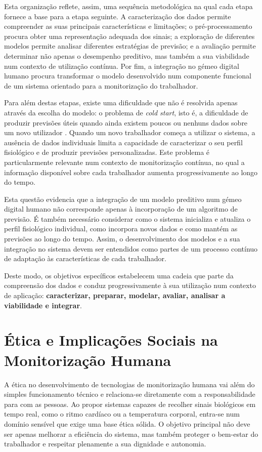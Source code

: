 Esta organização reflete, assim, uma sequência metodológica na qual cada etapa fornece a base para a etapa seguinte. A caracterização dos dados permite compreender as suas principais características e limitações; o pré-processamento procura obter uma representação adequada dos sinais; a exploração de diferentes modelos permite analisar diferentes estratégias de previsão; e a avaliação permite determinar não apenas o desempenho preditivo, mas também a sua viabilidade num contexto de utilização contínua. Por fim, a integração no gémeo digital humano procura transformar o modelo desenvolvido num componente funcional de um sistema orientado para a monitorização do trabalhador.

Para além destas etapas, existe uma dificuldade que não é resolvida apenas através da escolha do modelo: o problema de \textit{cold start}, isto é, a dificuldade de produzir previsões úteis quando ainda existem poucos ou nenhuns dados sobre um novo utilizador \cite{schein2002coldstart}. Quando um novo trabalhador começa a utilizar o sistema, a ausência de dados individuais limita a capacidade de caracterizar o seu perfil fisiológico e de produzir previsões personalizadas. Este problema é particularmente relevante num contexto de monitorização contínua, no qual a informação disponível sobre cada trabalhador aumenta progressivamente ao longo do tempo.

Esta questão evidencia que a integração de um modelo preditivo num gémeo digital humano não corresponde apenas à incorporação de um algoritmo de previsão. É também necessário considerar como o sistema inicializa e atualiza o perfil fisiológico individual, como incorpora novos dados e como mantém as previsões ao longo do tempo. Assim, o desenvolvimento dos modelos e a sua integração no sistema devem ser entendidos como partes de um processo contínuo de adaptação às características de cada trabalhador.

Deste modo, os objetivos específicos estabelecem uma cadeia que parte da compreensão dos dados e conduz progressivamente à sua utilização num contexto de aplicação: \textbf{caracterizar, preparar, modelar, avaliar, analisar a viabilidade e integrar}.

\section{Ética e Implicações Sociais na Monitorização Humana}
\label{sec:etica}

A ética no desenvolvimento de tecnologias de monitorização humana vai além do simples funcionamento técnico e relaciona-se diretamente com a responsabilidade para com as pessoas. Ao propor sistemas capazes de recolher sinais biológicos em tempo real, como o ritmo cardíaco ou a temperatura corporal, entra-se num domínio sensível que exige uma base ética sólida. O objetivo principal não deve ser apenas melhorar a eficiência do sistema, mas também proteger o bem-estar do trabalhador e respeitar plenamente a sua dignidade e autonomia.

